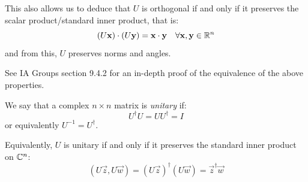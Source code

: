 \documentclass[../main.tex]{subfiles}
\begin{document}
This also allows us to deduce that $U$ is orthogonal if and only if it preserves the scalar product/standard inner product, that is:
\[
  (U\mathbf{\bm{x}}) \cdot (U\mathbf{\bm{y}}) = \mathbf{\bm{x}} \cdot \mathbf{\bm{y}} \quad \forall \mathbf{\bm{x}}, \mathbf{\bm{y}} \in \mathbb{R}^{n}
\]
and from this, $U$ preserves norms and angles.
\begin{remark}
  See IA Groups section 9.4.2 for an in-depth proof of the equivalence of the above properties.
\end{remark}
\begin{definition}
  We say that a complex $n \times n$ matrix is \textit{unitary} if:
  \[
    U^{\dag}U = UU^{\dag} = I
  \]
  or equivalently $U^{-1} = U^{\dag}$.
\end{definition}
Equivalently, $U$ is unitary if and only if it preserves the standard inner product on $\mathbb{C}^{n}$:
\[
  (U\vec{z}, U\vec{w}) = (U\vec{z})^{\dag} (U\vec{w}) = \vec{z}^{\dag} \vec{w}
\]
\end{document}
